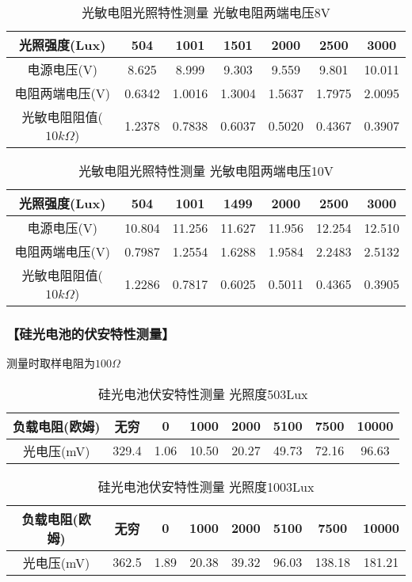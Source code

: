 \documentclass{ctexart}
\let\oldsubsubsection\subsubsection
\renewcommand{\subsubsection}[1]{\oldsubsubsection{\!\!\!\!\!\!【#1】}}
\begin{document}
\begin{table}[H]
  \centering
  \begin{tabular}{|c|c|c|c|c|c|c|}
    \hline
    光照强度(Lux) &504&1001&1501&2000&2500&3000\\\hline
    电源电压(V) &8.625&8.999&9.303&9.559&9.801&10.011\\\hline
    电阻两端电压(V) &0.6342&1.0016&1.3004&1.5637&1.7975&2.0095\\\hline
    光敏电阻阻值($10k\Omega$) & 1.2378&0.7838&0.6037&0.5020&0.4367&0.3907\\\hline
  \end{tabular}
  \caption{光敏电阻光照特性测量 光敏电阻两端电压8V}
\end{table}

\begin{table}[H]
  \centering
  \begin{tabular}{|c|c|c|c|c|c|c|}
    \hline
    光照强度(Lux) &504&1001&1499&2000&2500&3000\\\hline
    电源电压(V) &10.804&11.256&11.627&11.956&12.254&12.510\\\hline
    电阻两端电压(V) &0.7987&1.2554&1.6288&1.9584&2.2483&2.5132\\\hline
    光敏电阻阻值($10k\Omega$) & 1.2286&0.7817&0.6025&0.5011&0.4365&0.3905\\\hline
  \end{tabular}
  \caption{光敏电阻光照特性测量 光敏电阻两端电压10V}
\end{table}

\subsubsection{硅光电池的伏安特性测量}

测量时取样电阻为$100\Omega$

\begin{table}[H]
  \centering
  \begin{tabular}{|c|c|c|c|c|c|c|c|}
    \hline
    负载电阻(欧姆) &无穷&0&1000&2000&5100&7500&10000\\\hline
    光电压(mV) &329.4&1.06&10.50&20.27&49.73&72.16&96.63\\\hline
  \end{tabular}
  \caption{硅光电池伏安特性测量 光照度503Lux}
\end{table}

\begin{table}[H]
  \centering
  \begin{tabular}{|c|c|c|c|c|c|c|c|}
    \hline
    负载电阻(欧姆) &无穷&0&1000&2000&5100&7500&10000\\\hline
    光电压(mV) &362.5&1.89&20.38&39.32&96.03&138.18&181.21\\\hline
  \end{tabular}
  \caption{硅光电池伏安特性测量 光照度1003Lux}
\end{table}
\end{document}
